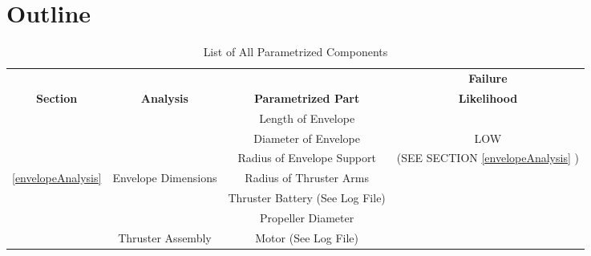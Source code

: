 \documentclass[../main.tex]{subfiles}
\begin{document}
\section{Outline}

\begin{table}[H]
	\centering
	\caption{List of All Parametrized Components}
	\label{allComponents}
	\begin{tabular}{|c|c|c|c|}
		\hline
		&                                       &                                                                  & \textbf{Failure}                                                      \\
		\multirow{-2}{*}{\textbf{Section}}       & \multirow{-2}{*}{\textbf{Analysis}}   & \multirow{-2}{*}{\textbf{Parametrized Part}}                     & \textbf{Likelihood}                                                   \\ \hline
		&                                       & Length of Envelope                                               &                                                                       \\ \cline{3-3}
		&                                       & Diameter of Envelope                                             & LOW                                                                   \\ \cline{3-3}
		&                                       & Radius of Envelope Support                                       & (SEE SECTION \ref{envelopeAnalysis} )                                                        \\ \cline{3-3}
		\multirow{-4}{*}{\ref{envelopeAnalysis}} & \multirow{-4}{*}{Envelope Dimensions} & Radius of Thruster Arms                                          & \multicolumn{1}{l|}{}                                                 \\ \hline
		&                                       & Thruster Battery (See Log File)                                  & \cellcolor[HTML]{C0C0C0}                                              \\ \cline{3-3}
		&                                       & Propeller Diameter                                               & \cellcolor[HTML]{C0C0C0}                                              \\ \cline{3-3}
		& Thruster Assembly                     & Motor (See Log File)                                             & \cellcolor[HTML]{C0C0C0}                                              \\ \cline{3-3}

\end{tabular}
\end{table}
\end{document}
